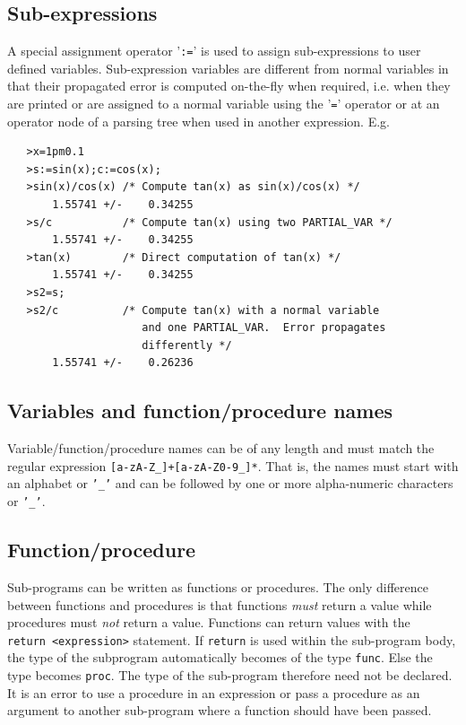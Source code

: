 \documentclass[acmtoms,acmnow]{acmtrans2m}
\begin{document}
\subsection{Sub-expressions}
\label{APPEN:SUBEXPRESSIONS}

A special assignment operator '{\tt :=}' is used to assign
sub-expressions to user defined variables.  Sub-expression variables
are different from normal variables in that their propagated error is
computed on-the-fly when required, i.e.  when they are printed or are
assigned to a normal variable using the '{\tt =}' operator or at an
operator node of a parsing tree when used in another expression.  E.g.
\begin{verbatim}
   >x=1pm0.1
   >s:=sin(x);c:=cos(x);
   >sin(x)/cos(x) /* Compute tan(x) as sin(x)/cos(x) */
       1.55741 +/-    0.34255
   >s/c           /* Compute tan(x) using two PARTIAL_VAR */
       1.55741 +/-    0.34255
   >tan(x)        /* Direct computation of tan(x) */
       1.55741 +/-    0.34255
   >s2=s;
   >s2/c          /* Compute tan(x) with a normal variable
                     and one PARTIAL_VAR.  Error propagates 
                     differently */
       1.55741 +/-    0.26236
\end{verbatim}

\subsection{Variables and function/procedure names}

Variable/function/procedure names can be of any length and must match
the regular expression {\tt [a-zA-Z\_]+[a-zA-Z0-9\_]*}.  That is, the
names must start with an alphabet or {\tt '\_'} and can be followed by
one or more alpha-numeric characters or {\tt '\_'}.

\subsection{Function/procedure}
\label{APPEN:SYNTAX_FUNC}

Sub-programs can be written as functions or procedures.  The only
difference between functions and procedures is that functions {\it
  must} return a value while procedures must {\it not} return a value.
Functions can return values with the {\tt return}~{\tt <expression>}
statement.  If {\tt return} is used within the sub-program body, the
type of the subprogram automatically becomes of the type {\tt func}.
Else the type becomes {\tt proc}.  The type of the sub-program
therefore need not be declared.  It is an error to use a procedure in
an expression or pass a procedure as an argument to another
sub-program where a function should have been passed.
\end{document}
